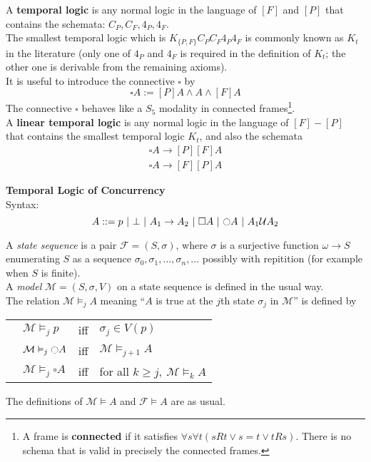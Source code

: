 \documentclass{article}
\begin{document}
A \textbf{temporal logic} is any normal logic in the language of $[F]$ and $[P]$ that contains the schemata: $C_P, C_F, 4_P, 4_F$.\\

The smallest temporal logic which is $K_{\{P,F\}}C_PC_F4_P4_F$ is commonly known as $K_t$ in the literature (only one of $4_P$ and $4_F$ is required in the definition of $K_t$; the other one is derivable from the remaining axioms).\\

It is useful to introduce the connective $\square$ by
\[\square A := [P]A\land A\land [F]A\]
The connective $\square$ behaves like a $S_5$ modality in connected frames\footnote{A frame is \textbf{connected} if it satisfies $\forall s\forall t (sRt\lor s=t\lor tRs)$.
	There is no schema that is valid in precisely the connected frames.}.\\

A \textbf{linear temporal logic} is any normal logic in the language of $[F]-[P]$ that contains the smallest temporal logic $K_t$, and also the schemata
\begin{align*}
\square A\rightarrow [P][F]A\\
\square A\rightarrow [F][P]A
\end{align*}

\textbf{Temporal Logic of Concurrency}\\

Syntax: \[A::=p\ |\ \bot\ |\ A_1\rightarrow A_2\ |\ \square A\ |\ \fullmoon A\ |\ A_1\mathcal{U}A_2\]

A \emph{state sequence} is a pair $\mathcal{F}=(S,\sigma)$, where $\sigma$ is a surjective function $\omega\rightarrow S$ enumerating $S$ as a sequence $\sigma_0,\sigma_1,\ldots,\sigma_n,\ldots$ possibly with repitition (for example 
when $S$ is finite).\\

A \emph{model} $\mathcal{M}=(S,\sigma,V)$ on a state sequence is defined in the usual way.\\

The relation $\mathcal{M}\vDash_j A$ meaning ``$A$ is true at the $j$th state $\sigma_j$ in $\mathcal{M}$'' is defined by
\begin{center}
\begin{tabular}{r @{ } l c l}
 &$\mathcal{M}\vDash_jp$ &iff& $\sigma_j\in V(p)$\\
 &$\mathcal{M}\vDash_j\fullmoon A$ &iff& $\mathcal{M}\vDash_{j+1}A$\\
 &$\mathcal{M}\vDash_j\square A$ &iff& for all $k\geq j,\ \mathcal{M}\vDash_k A$
\end{tabular}
\end{center}
The definitions of $\mathcal{M}\vDash A$ and $\mathcal{F}\vDash A$ are as usual.
\end{document}
